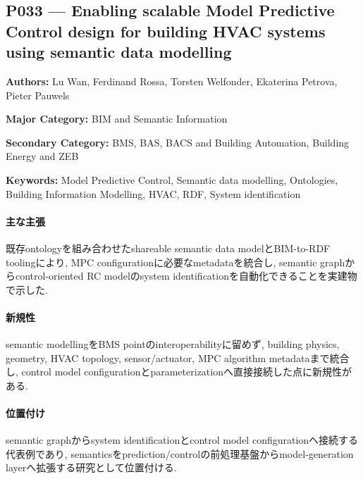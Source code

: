 \subsection{P033 --- Enabling scalable Model Predictive Control design for building HVAC systems using semantic data modelling}
\label{paper:P033}
\textbf{Authors:} Lu Wan, Ferdinand Rossa, Torsten Welfonder, Ekaterina Petrova, Pieter Pauwels\par
\textbf{Major Category:} BIM and Semantic Information\par
\textbf{Secondary Category:} BMS, BAS, BACS and Building Automation, Building Energy and ZEB\par
\textbf{Keywords:} Model Predictive Control, Semantic data modelling, Ontologies, Building Information Modelling, HVAC, RDF, System identification\par
\paragraph{主な主張}
既存ontologyを組み合わせたshareable semantic data modelとBIM-to-RDF toolingにより, MPC configurationに必要なmetadataを統合し, semantic graphからcontrol-oriented RC modelのsystem identificationを自動化できることを実建物で示した. \cite{Wan:2025SemanticMPC}
\paragraph{新規性}
semantic modellingをBMS pointのinteroperabilityに留めず, building physics, geometry, HVAC topology, sensor/actuator, MPC algorithm metadataまで統合し, control model configurationとparameterizationへ直接接続した点に新規性がある.
\paragraph{位置付け}
semantic graphからsystem identificationとcontrol model configurationへ接続する代表例であり, semanticsをprediction/controlの前処理基盤からmodel-generation layerへ拡張する研究として位置付ける.
